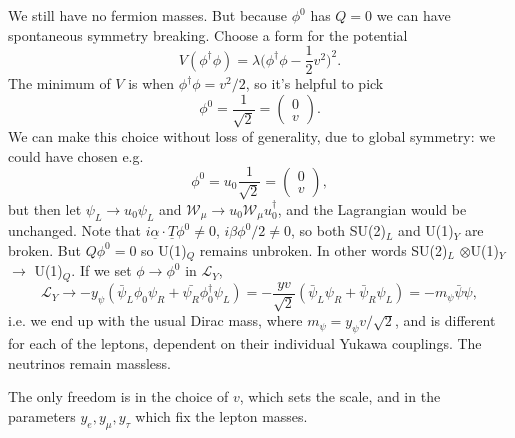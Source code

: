 We still have no fermion masses. But because $\phi^0$ has $Q=0$ we can have spontaneous symmetry breaking. Choose a form for the potential
\begin{equation}
V(\phi^\dagger \phi) = \lambda \bigg(\phi^\dagger \phi - \frac{1}{2}v^2\bigg)^2.
\end{equation}
The minimum of $V$ is when $\phi^\dagger \phi = v^2/2$, so it's helpful to pick 
\[\phi^0 = \frac{1}{\sqrt{2}} = \left( \begin{array}{cc}
0   \\
v   \end{array} \right). \]
We can make this choice without loss of generality, due to global symmetry: we could have chosen e.g.
\[\phi^0 = u_0\frac{1}{\sqrt{2}} = \left( \begin{array}{cc}
0   \\
v   \end{array} \right), \]
but then let $\psi_L \to u_0 \psi_L$ and $\mathcal{W}_\mu \to u_0 \mathcal{W}_\mu u_0^\dagger$, and the Lagrangian would be unchanged.
Note that $i \underline{\alpha}\cdot \underline{T} \phi^0 \neq 0$, $i\beta\phi^0/2 \neq 0$, so both SU(2)$_L$ and U(1)$_Y$ are broken. But $Q\phi^0 = 0$ so U(1)$_Q$ remains unbroken. In other words SU(2)$_L$ $\otimes$U(1)$_Y$ $\to$ U(1)$_Q$. If we set $\phi \to \phi^0$ in $\mathcal{L}_Y$,
\begin{equation}
\mathcal{L}_Y \to -y_\psi (\bar{\psi}_L \phi_0 \psi_R + \bar{\psi_R} \phi_0^\dagger \psi_L) = -\frac{yv}{\sqrt{2}}(\bar{\psi}_L \psi_R + \bar{\psi}_R \psi_L) = -m_\psi \bar{\psi} \psi,
\end{equation}
i.e. we end up with the usual Dirac mass, where $m_\psi = y_\psi v/\sqrt{2}$, and is different for each of the leptons, dependent on their individual Yukawa couplings. The neutrinos remain massless. 

The only freedom is in the choice of $v$, which sets the scale, and in the parameters $y_e, y_\mu, y_\tau$ which fix the lepton masses.

